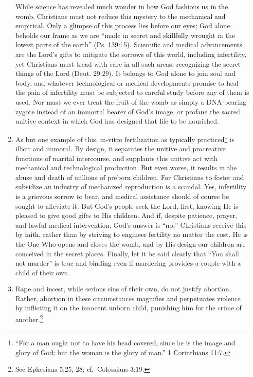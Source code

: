 \documentclass[
]{book}
\begin{document}
\begin{enumerate}
  While science has revealed much wonder in how God fashions us in the womb, Christians must not reduce this mystery to the mechanical and empirical. Only a glimpse of this process lies before our eyes; God alone beholds our frame as we are ``made in secret and skillfully wrought in the lowest parts of the earth'' (Ps. 139:15). Scientific and medical advancements are the Lord's gifts to mitigate the sorrows of this world, including infertility, yet Christians must tread with care in all such areas, recognizing the secret things of the Lord (Deut. 29:29). It belongs to God alone to join soul and body, and whatever technological or medical developments promise to heal the pain of infertility must be subjected to careful study before any of them is used. Nor must we ever treat the fruit of the womb as simply a DNA-bearing zygote instead of an immortal bearer of God's image, or profane the sacred unitive context in which God has designed that life to be nourished.
\item
  As but one example of this, in-vitro fertilization as typically practiced\footnote{``For a man ought not to have his head covered, since he is the image and glory of God; but the woman is the glory of man.'' 1 Corinthians 11:7.} is illicit and immoral. By design, it separates the unitive and procreative functions of marital intercourse, and supplants this unitive act with mechanical and technological production. But even worse, it results in the abuse and death of millions of preborn children. For Christians to foster and subsidize an industry of mechanized reproduction is a scandal. Yes, infertility is a grievous sorrow to bear, and medical assistance should of course be sought to alleviate it. But God's people seek the Lord, first, knowing He is pleased to give good gifts to His children. And if, despite patience, prayer, and lawful medical intervention, God's answer is ``no,'' Christians receive this by faith, rather than by striving to engineer fertility no matter the cost. He is the One Who opens and closes the womb, and by His design our children are conceived in the secret places. Finally, let it be said clearly that ``You shall not murder'' is true and binding even if murdering provides a couple with a child of their own.
\item
  Rape and incest, while serious sins of their own, do not justify abortion. Rather, abortion in these circumstances magnifies and perpetuates violence by inflicting it on the innocent unborn child, punishing him for the crime of another.\footnote{See Ephesians 5:25, 28; cf.~Colossians 3:19.}

\end{enumerate}
\end{document}
